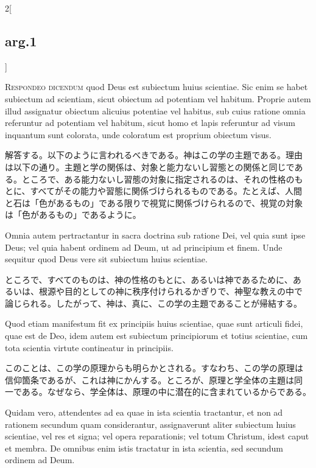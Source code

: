 \documentclass[
paper=a4paper,
fontsize=10pt,
jafontsize=9pt,
titlepage
]{jlreq}
\begin{document}
\begin{paracol}{2}[\subsection{arg.1}]


{\scshape Respondeo dicendum} quod Deus est subiectum huius
scientiae. Sic enim se habet subiectum ad scientiam, sicut obiectum ad
potentiam vel habitum. Proprie autem illud assignatur obiectum
alicuius potentiae vel habitus, sub cuius ratione omnia referuntur ad
potentiam vel habitum, sicut homo et lapis referuntur ad visum
inquantum sunt colorata, unde coloratum est proprium obiectum visus.

\switchcolumn

解答する。以下のように言われるべきである。神はこの学の主題である。理由
は以下の通り。主題と学の関係は、対象と能力ないし習態との関係と同じであ
る。ところで、ある能力ないし習態の対象に指定されるのは、それの性格のも
とに、すべてがその能力や習態に関係づけられるものである。たとえば、人間
と石は「色があるもの」である限りで視覚に関係づけられるので、視覚の対象
は「色があるもの」であるように。

\switchcolumn*

Omnia autem pertractantur in sacra doctrina sub ratione Dei, vel quia
sunt ipse Deus; vel quia habent ordinem ad Deum, ut ad principium et
finem. Unde sequitur quod Deus vere sit subiectum huius scientiae.

\switchcolumn

ところで、すべてのものは、神の性格のもとに、あるいは神であるために、あ
るいは、根源や目的としての神に秩序付けられるかぎりで、神聖な教えの中で
論じられる。したがって、神は、真に、この学の主題であることが帰結する。

\switchcolumn*

Quod etiam manifestum fit ex principiis huius scientiae, quae sunt
articuli fidei, quae est de Deo, idem autem est subiectum principiorum
et totius scientiae, cum tota scientia virtute contineatur in
principiis.

\switchcolumn

このことは、この学の原理からも明らかとされる。すなわち、この学の原理は
信仰箇条であるが、これは神にかんする。ところが、原理と学全体の主題は同
一である。なぜなら、学全体は、原理の中に潜在的に含まれているからである。

\switchcolumn*

Quidam vero, attendentes ad ea quae in ista scientia tractantur, et
non ad rationem secundum quam considerantur, assignaverunt aliter
subiectum huius scientiae, vel res et signa; vel opera reparationis;
vel totum Christum, idest caput et membra. De omnibus enim istis
tractatur in ista scientia, sed secundum ordinem ad Deum.


\end{paracol}
\end{document}
